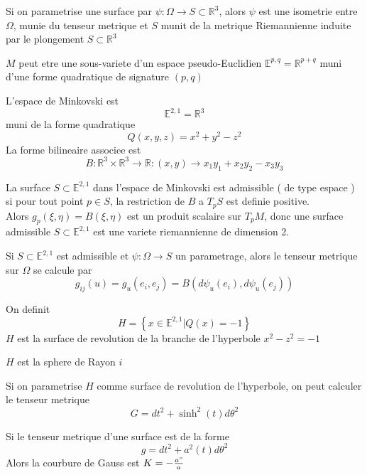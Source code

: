 \documentclass[../main.tex]{subfiles}
\begin{document}
\begin{rmq}
Si on parametrise une surface par $\psi: \Omega\to S \subset \mathbb{R}^{3}$, alors $\psi$ est une isometrie entre $\Omega$, munie du tenseur metrique et $S$ munit de la metrique Riemannienne induite par le plongement $S \subset \mathbb{R}^{3}$ 
\end{rmq}
$M$ peut etre une sous-variete d'un espace pseudo-Euclidien $ \mathbb{E}^{p,q}= \mathbb{R}^{p+q}$ muni d'une forme quadratique de signature $( p,q) $
\begin{exemple}
L'espace de Minkovski est 
\[ 
\mathbb{E}^{2,1}= \mathbb{R}^{3}
\]
muni de la forme quadratique 
\[ 
Q( x,y,z) = x^{2} + y^{2} - z^{2}
\]
La forme bilineaire associee est 
\[ 
B: \mathbb{R}^{3}\times \mathbb{R}^{3}\to \mathbb{R}: ( x,y) \to x_1y_1 + x_2y_2 - x_3y_3
\]
		
\end{exemple}
\begin{defn}
	La surface $S \subset  \mathbb{E}^{2,1}$ dans l'espace de Minkovski est admissible ( de type espace ) si pour tout point $p\in S$, la restriction de $B$ a $T_pS$ est definie positive.\\
	Alors $g_p ( \xi, \eta) = B( \xi, \eta) $ est un produit scalaire sur $T_p M$, donc une surface admissible $S \subset  \mathbb{E}^{2,1}$ est une variete riemannienne de dimension 2.
\end{defn}
\begin{rmq}
Si $S \subset  \mathbb{E}^{2,1}$ est admissible et $\psi: \Omega\to S$ un parametrage, alors le tenseur metrique sur $\Omega$ se calcule par 
\[ 
g_{ij} ( u) = g_u(e_i, e_j ) = B ( d\psi_u ( e_i) , d\psi_u( e_j) ) 
\]

\end{rmq}
\begin{exemple}
On definit 
\[ 
H = \left\{ x\in \mathbb{E}^{2,1}| Q( x) = -1 \right\} 
\]
$H$ est la surface de revolution de la branche de l'hyperbole $x^{2}-z^{2}= -1$ 

\end{exemple}
\begin{rmq}
$H$ est la sphere de Rayon $i$ 
\end{rmq}
Si on parametrise $H$ comme surface de revolution de l'hyperbole, on peut calculer le tenseur metrique
\[ 
G = dt^{2}+ \sinh^{2}( t) d\theta^{2}
\]

\begin{propo}
Si le tenseur metrique d'une surface est de la forme 
\[ 
g= dt^{2}+ a^{2}( t) d\theta^{2}
\]
Alors la courbure de Gauss est $K = - \frac{a"}{a}$ 
\end{propo}
\end{document}
